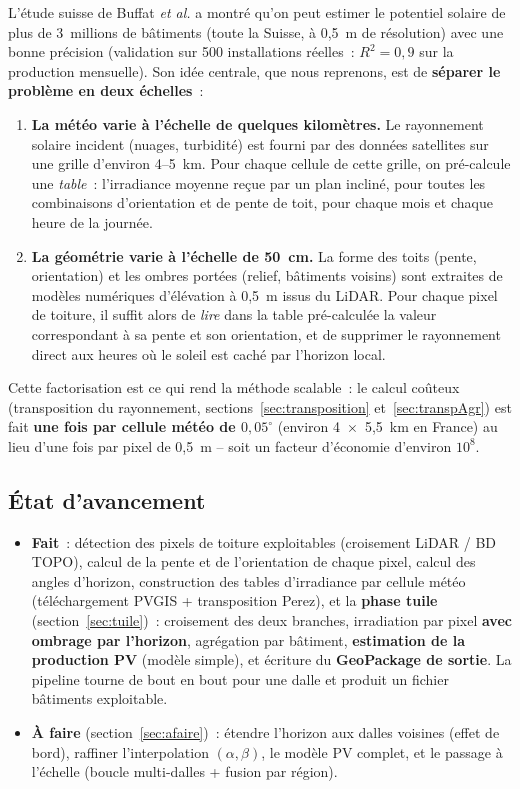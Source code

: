 \documentclass[11pt,a4paper]{article}
\begin{document}
L'étude suisse de Buffat \emph{et al.} a montré qu'on peut estimer le potentiel
solaire de plus de 3~millions de bâtiments (toute la Suisse, à 0,5~m de
résolution) avec une bonne précision (validation sur 500 installations réelles~:
$R^2 = 0{,}9$ sur la production mensuelle). Son idée centrale, que nous
reprenons, est de \textbf{séparer le problème en deux échelles}~:

\begin{enumerate}
  \item \textbf{La météo varie à l'échelle de quelques kilomètres.} Le
    rayonnement solaire incident (nuages, turbidité) est fourni par des données
    satellites sur une grille d'environ 4--5~km. Pour chaque cellule de cette
    grille, on pré-calcule une \emph{table}~: l'irradiance moyenne reçue par un
    plan incliné, pour toutes les combinaisons d'orientation et de pente de
    toit, pour chaque mois et chaque heure de la journée.
  \item \textbf{La géométrie varie à l'échelle de 50~cm.} La forme des toits
    (pente, orientation) et les ombres portées (relief, bâtiments voisins) sont
    extraites de modèles numériques d'élévation à 0,5~m issus du LiDAR. Pour
    chaque pixel de toiture, il suffit alors de \emph{lire} dans la table
    pré-calculée la valeur correspondant à sa pente et son orientation, et de
    supprimer le rayonnement direct aux heures où le soleil est caché par
    l'horizon local.
\end{enumerate}

Cette factorisation est ce qui rend la méthode scalable~: le calcul coûteux
(transposition du rayonnement, sections~\ref{sec:transposition}
et~\ref{sec:transpAgr}) est fait \textbf{une fois par cellule météo de
$0{,}05^\circ$} (environ 4~$\times$~5,5~km en France) au lieu d'une fois par
pixel de 0,5~m -- soit un facteur d'économie d'environ $10^8$.

\subsection{État d'avancement}

\begin{itemize}
  \item \textbf{Fait}~: détection des pixels de toiture exploitables (croisement
    LiDAR / BD TOPO), calcul de la pente et de l'orientation de chaque pixel,
    calcul des angles d'horizon, construction des tables d'irradiance par cellule
    météo (téléchargement PVGIS + transposition Perez), et la \textbf{phase
    tuile} (section~\ref{sec:tuile})~: croisement des deux branches, irradiation
    par pixel \textbf{avec ombrage par l'horizon}, agrégation par bâtiment,
    \textbf{estimation de la production PV} (modèle simple), et écriture du
    \textbf{GeoPackage de sortie}. La pipeline tourne de bout en bout pour une
    dalle et produit un fichier bâtiments exploitable.
  \item \textbf{À faire} (section~\ref{sec:afaire})~: étendre l'horizon aux dalles
    voisines (effet de bord), raffiner l'interpolation $(\alpha,\beta)$, le modèle
    PV complet, et le passage à l'échelle (boucle multi-dalles + fusion par
    région).
\end{itemize}
\end{document}
